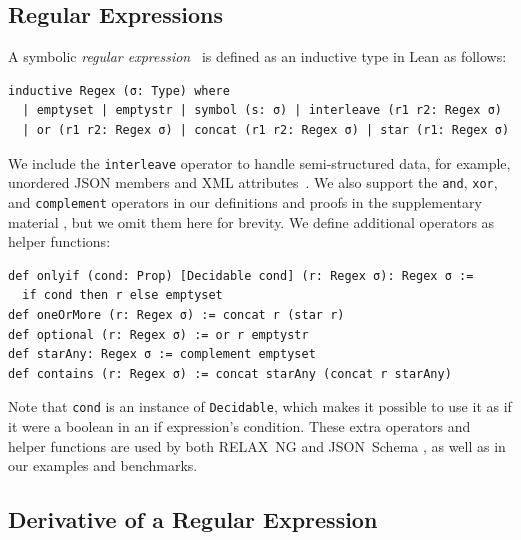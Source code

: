 \documentclass[runningheads]{llncs}
\newcommand{\RelaxNG}{%
  RELAX~NG\xspace%
}
\newcommand{\JSONSchema}{%
  JSON~Schema\xspace%
}
\newcommand{\supplementarymaterial}{%
  supplementary material\xspace%
}
\newcommand{\JSON}{\ac{JSON}\xspace}
\newcommand{\XML}{\ac{XML}\xspace}
\begin{document}
\subsection{Regular Expressions}
A symbolic \emph{regular expression}~\cite{brzozowski1964derivatives,stanford2021symbolic,elliott2021symbolic} is defined as an inductive type in Lean as follows:
\begin{lstlisting}[label=Regex]
inductive Regex (σ: Type) where
  | emptyset | emptystr | symbol (s: σ) | interleave (r1 r2: Regex σ)
  | or (r1 r2: Regex σ) | concat (r1 r2: Regex σ) | star (r1: Regex σ)
\end{lstlisting}
We include the \lstinline{interleave} operator to handle semi-structured data, for example, unordered \JSON members and \XML attributes~\cite{hosoya2010foundations}.
We also support the \lstinline{and}, \lstinline{xor}, and \lstinline{complement} operators in our definitions and proofs in the \supplementarymaterial, but we omit them here for brevity.
We define additional operators as helper functions:
\begin{lstlisting}
def onlyif (cond: Prop) [Decidable cond] (r: Regex σ): Regex σ :=
  if cond then r else emptyset
def oneOrMore (r: Regex σ) := concat r (star r)
def optional (r: Regex σ) := or r emptystr
def starAny: Regex σ := complement emptyset
def contains (r: Regex σ) := concat starAny (concat r starAny)
\end{lstlisting}
Note that \lstinline{cond} is an instance of \lstinline{Decidable}, which makes it possible to use it as if it were a boolean in an if expression's condition.
These extra operators and helper functions are used by both \RelaxNG and \JSONSchema, as well as in our examples and benchmarks.

\subsection{Derivative of a Regular Expression}
\end{document}
